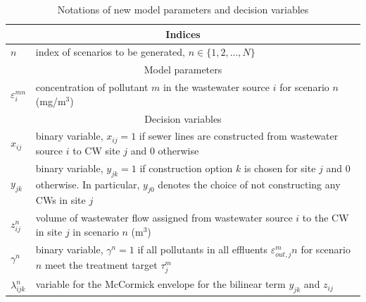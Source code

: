 \documentclass[preprint,12pt,authoryear]{elsarticle}
\begin{document}
\begin{table}[!htpb]
	\setlength{\extrarowheight}{1.5mm}
	\caption{Notations of new model parameters and decision variables}
	\begin{tabular}{|p{1.5cm} p{16cm}|}
		\hline
		\multicolumn{2}{|c|}{Indices} \\
		\hline
		$n$ & index of scenarios to be generated, $n\in\{1,2,...,N\}$\\
		\hline
		\multicolumn{2}{|c|}{Model parameters} \\
		\hline
		$\varepsilon_i^{mn}$ & concentration of pollutant $m$ in the wastewater source $i$ for scenario $n$ (mg/m$^3$)\\
		\hline
		\multicolumn{2}{|c|}{Decision variables}\\
		\hline	
		$x_{ij}$ & binary variable, $x_{ij}=1$ if sewer lines are constructed from wastewater source $i$ to CW site $j$ and $0$ otherwise\\
		$y_{jk}$ & binary variable, $y_{jk}=1$ if construction option $k$ is chosen for site $j$ and $0$ otherwise. In particular, $y_{j0}$ denotes the choice of not constructing any CWs in site $j$\\
		$z_{ij}^n$ & volume of wastewater flow assigned from wastewater source $i$ to the CW in site $j$ in scenario $n$  (m$^3$)\\
		$\gamma^n$ & binary variable, $\gamma^n = 1$ if all pollutants in all effluents $\varepsilon_{out,j}^mn$ for scenario $n$ meet the treatment target $\tau_j^m$\\
		$\lambda_{ijk}^n$ & variable for the McCormick envelope for the bilinear term $y_{jk}$ and $z_{ij}$\\ 
		\hline	
	\end{tabular}

	\label{table:modelparameters1}
\end{table}
\setcounter{equation}{0}
\end{document}
